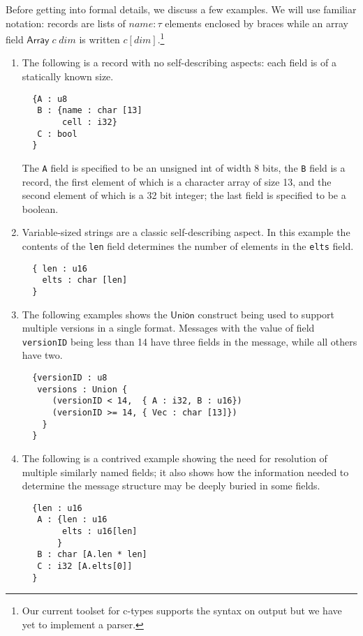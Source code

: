 \documentclass[svgnames]{llncs}
\newcommand{\konst}[1]{\ensuremath{\mathsf{#1}}}
\begin{document}
Before getting into formal details, we discuss a few examples.  We
will use familiar notation: records are lists of $\mathit{name} :
\tau$ elements enclosed by braces while an array field
$\konst{Array}\;c\;\mathit{dim}$ is written $c
    [\mathit{dim}]$.\footnote{Our current toolset for c-types supports
      the syntax on output but we have yet to implement a parser.}

\begin{enumerate}

\item The following is a record with no self-describing aspects: each
  field is of a statically known size.

\begin{verbatim}
  {A : u8
   B : {name : char [13]
        cell : i32}
   C : bool
  }
\end{verbatim}

The \verb+A+ field is specified to be an unsigned int of width 8 bits,
the \verb+B+ field is a record, the first element of which is a
character array of size 13, and the second element of which is a 32
bit integer; the last field is specified to be a
boolean.

\item Variable-sized strings are a classic self-describing aspect. In
  this example the contents of the \verb+len+ field determines the
  number of elements in the \verb+elts+ field.

\begin{verbatim}
  { len : u16
    elts : char [len]
  }
\end{verbatim}


\item The following examples shows the \konst{Union} construct being
  used to support multiple versions in a single format.  Messages with
  the value of field \verb+versionID+ being less than 14 have three
  fields in the message, while all others have two.

\begin{verbatim}
  {versionID : u8
   versions : Union {
      (versionID < 14,  { A : i32, B : u16})
      (versionID >= 14, { Vec : char [13]})
    }
  }
\end{verbatim}

\item The following is a contrived example showing the need for
  resolution of multiple similarly named fields; it also shows how the
  information needed to determine the message structure may be deeply
  buried in some fields.

\begin{verbatim}
  {len : u16
   A : {len : u16
        elts : u16[len]
       }
   B : char [A.len * len]
   C : i32 [A.elts[0]]
  }
\end{verbatim}

\end{enumerate}
\end{document}
